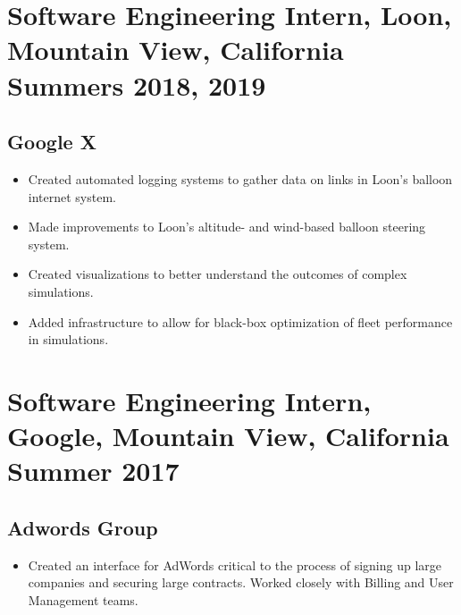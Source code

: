 \documentclass{article}
\begin{document}

\section*{\textbf{Software Engineering Intern, Loon, Mountain View, California \hfill Summers 2018, 2019}}
\subsection*{Google X}
\begin{itemize}[noitemsep]
    \item Created automated logging systems to gather data on links in Loon’s balloon internet system.
    \item Made improvements to Loon's altitude- and wind-based balloon steering system.
    \item Created visualizations to better understand the outcomes of complex simulations.
    \item Added infrastructure to allow for black-box optimization of fleet performance in simulations.
\end{itemize}

\section*{\textbf{Software Engineering Intern, Google, Mountain View, California \hfill Summer 2017}}
\subsection*{Adwords Group}
\begin{itemize}
    \item Created an interface for AdWords critical to the process of signing up large companies and securing large contracts. Worked closely with Billing and User Management teams.
\end{itemize}
\end{document}
